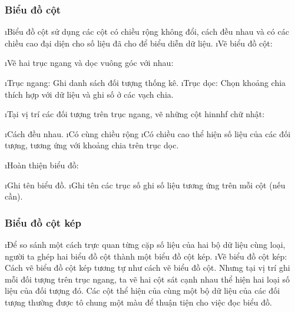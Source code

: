 \subsubsection{Biểu đồ cột}
\begin{enumerate}[--,leftmargin=*]
	\i Biểu đồ cột sử dụng các cột có chiều rộng không đổi, cách đều nhau và có các chiều cao đại diện cho số liệu đã cho để biểu diễn dữ liệu.
	\i Vẽ biểu đồ cột:
	\begin{enumerate}[Bước 1.,leftmargin=*]
		\i Vẽ hai trục ngang và dọc vuông góc với nhau:
		\begin{enumerate}[+,leftmargin=*]
			\i Trục ngang: Ghi danh sách đối tượng thống kê.
			\i Trục dọc: Chọn khoảng chia thích hợp với dữ liệu và ghi số ở các vạch chia.
		\end{enumerate}
		\i Tại vị trí các đối tượng trên trục ngang, vẽ những cột hinnhf chữ nhật:
		\begin{enumerate}[+,leftmargin=*]
			\i Cách đều nhau.
			\i Có cùng chiều rộng
			\i Có chiều cao thể hiện số liệu của các đối tượng, tương ứng với khoảng chia trên trục dọc.
		\end{enumerate}
		\i Hoàn thiện biểu đồ:
		\begin{enumerate}[+,leftmargin=*]
			\i Ghi tên biểu đồ.
			\i Ghi tên các trục số ghi số liệu tương ứng trên mỗi cột (nếu cần).
		\end{enumerate}
	\end{enumerate}
\end{enumerate}
\subsubsection{Biểu đồ cột kép}
\begin{enumerate}[--,leftmargin=*]
	\i Để so sánh một cách trực quan từng cặp số liệu của hai bộ dữ liệu cùng loại, người ta ghép hai biểu đồ cột thành một biểu đồ cột kép.
	\i Vẽ biểu đồ cột kép: \\
	Cách vẽ biểu đồ cột kép tương tự như cách vẽ biểu đồ cột. Nhưng tại vị trí ghi mỗi đối tượng trên trục ngang, ta vẽ hai cột sát cạnh nhau thể hiện hai loại số liệu của đối tượng đó. Các cột thể hiện của cùng một bộ dữ liệu của các đối tượng thường được tô chung một màu để thuận tiện cho việc đọc biểu đồ.
\end{enumerate}
